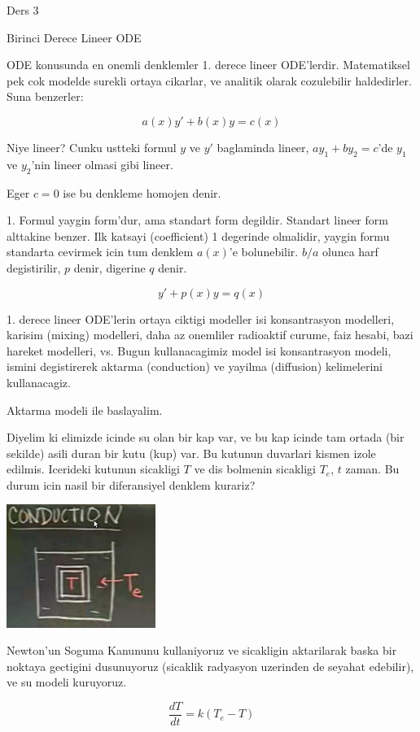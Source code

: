 \documentclass[12pt,fleqn]{article}
\begin{document}
Ders 3

Birinci Derece Lineer ODE

ODE konusunda en onemli denklemler 1. derece lineer
ODE'lerdir. Matematiksel pek cok modelde surekli ortaya cikarlar, ve
analitik olarak cozulebilir haldedirler. Suna benzerler:

\[ a(x)y' + b(x)y = c(x) \]

Niye lineer? Cunku ustteki formul $y$ ve $y'$ baglaminda lineer, 
$ay_1 + by_2 = c$'de $y_1$ ve $y_2$'nin lineer olmasi gibi lineer.

Eger $c = 0$ ise bu denkleme homojen denir. 

1. Formul yaygin form'dur, ama standart form degildir. Standart lineer form alttakine
benzer. Ilk katsayi (coefficient) 1 degerinde olmalidir, yaygin formu standarta
cevirmek icin tum denklem $a(x)$'e bolunebilir. $b/a$ olunca harf degistirilir,
$p$ denir, digerine $q$ denir.

\[ y' + p(x)y = q(x) \]

1. derece lineer ODE'lerin ortaya ciktigi modeller isi konsantrasyon modelleri,
karisim (mixing) modelleri, daha az onemliler radioaktif curume, faiz hesabi,
bazi hareket modelleri, vs. Bugun kullanacagimiz model isi konsantrasyon
modeli, ismini degistirerek aktarma (conduction) ve yayilma (diffusion)
kelimelerini kullanacagiz. 

Aktarma modeli ile baslayalim. 

Diyelim ki elimizde icinde su olan bir kap var, ve bu kap icinde tam
ortada (bir sekilde) asili duran bir kutu (kup) var. Bu kutunun
duvarlari kismen izole edilmis. Icerideki kutunun sicakligi $T$ ve dis
bolmenin sicakligi $T_e$, $t$ zaman. Bu durum icin nasil bir
diferansiyel denklem kurariz?

\includegraphics[height=4cm]{3_1.png}

Newton'un Soguma Kanununu kullaniyoruz ve sicakligin aktarilarak baska
bir noktaya gectigini dusunuyoruz (sicaklik radyasyon uzerinden de
seyahat edebilir), ve su modeli kuruyoruz. 

\[ \frac{dT}{dt} = k(T_e - T) \]
\end{document}
